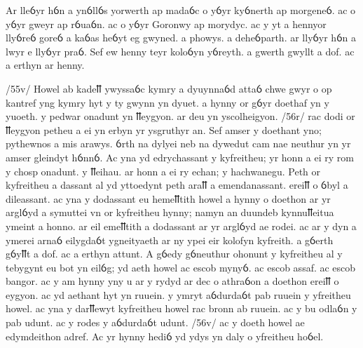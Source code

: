 \begin{spacing}{1}
\begin{pages}
\begin{Leftside}
      \pend
      \pstart
      Ar lleỽyr hỽn a ynỽllỽs yorwerth ap madaỽc o yỽyr kyỽnerth ap morgeneỽ. ac o yỽyr gweyr ap rỽuaỽn. ac o yỽyr Goronwy ap morydyc. ac y yt a hennyor llyỽreỽ goreỽ a kaỽas heỽyt eg gwyned. a phowys. a deheỽparth. ar llyỽyr hỽn a lwyr e llyỽyr praỽ. Sef ew henny teyr koloỽyn yỽreyth. a gwerth gwyllt a dof. ac a erthyn ar henny.
      \pend
      \endnumbering
    \end{Leftside}
    \begin{Rightside}
      \beginnumbering
      \textup{/55v/} Howel ab kadeỻ ywyssaỽc kymry a dyuynnaỽd attaỽ chwe gwyr o op kantref yng kymry hyt y ty gwynn yn dyuet. a hynny or gỽyr doethaf yn y yuoeth. y pedwar onadunt yn ỻeygyon. ar deu yn yscolheigyon. \textup{/56r/} rac dodi or ỻeygyon petheu a ei yn erbyn yr ysgruthyr an. Sef amser y doethant yno; pythewnos a mis arawys. ỽrth na dylyei neb na dywedut cam nae neuthur yn yr amser gleindyt hỽnnỽ.
      \pend
      \pstart
      Ac yna yd edrychassant y kyfreitheu; yr honn a ei ry rom y chosp onadunt. y ỻeihau. ar honn a ei ry echan; y hachwanegu. Peth or kyfreitheu a dassant al yd yttoedynt peth araỻ a emendanassant. ereiỻ o ỽbyl a dileassant.
      \pend
      \pstart
      ac yna y dodassant eu hemeỻtith howel a hynny o doethon ar yr arglỽyd a symuttei vn or kyfreitheu hynny; namyn an duundeb kynnuỻeitua ymeint a honno. ar eil emeỻtith a dodassant ar yr arglỽyd ae rodei. ac ar y dyn a ymerei arnaỽ eilygdaỽt ygneityaeth ar ny ypei eir kolofyn kyfreith. a gỽerth gỽyỻt a dof. ac a erthyn attunt.
      \pend
      \pstart
      A gỽedy gỽneuthur ohonunt y kyfreitheu al y tebygynt eu bot yn eilỽg; yd aeth howel ac escob mynyỽ. ac escob assaf. ac escob bangor. ac y am hynny yny u ar y rydyd ar dec o athraỽon a doethon ereiỻ o eygyon. ac yd aethant hyt yn ruuein. y ymryt aỽdurdaỽt pab ruuein y yfreitheu howel. ac yna y darỻewyt kyfreitheu howel rac bronn ab ruuein. ac y bu odlaỽn y pab udunt. ac y rodes y aỽdurdaỽt udunt. \textup{/56v/} ac y doeth howel ae edymdeithon adref. Ac yr hynny hediỽ yd ydys yn daly o yfreitheu hoỽel.

\end{Rightside}
\end{pages}
\end{spacing}
